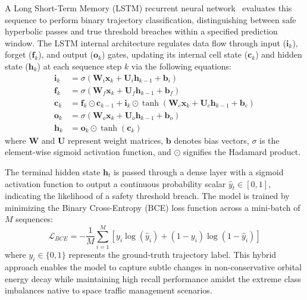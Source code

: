 \documentclass[letterpaper, preprint, 11pt]{AAS}
\begin{document}
A Long Short-Term Memory (LSTM) recurrent neural network~\cite{hochreiter_long_1997} evaluates this sequence to perform binary trajectory classification, distinguishing between safe hyperbolic passes and true threshold breaches within a specified prediction window. The LSTM internal architecture regulates data flow through input ($\mathbf{i}_k$), forget ($\mathbf{f}_k$), and output ($\mathbf{o}_k$) gates, updating its internal cell state ($\mathbf{c}_k$) and hidden state ($\mathbf{h}_k$) at each sequence step $k$ via the following equations:
\begin{align}
    \mathbf{i}_k &= \sigma\left( \mathbf{W}_i \mathbf{x}_k + \mathbf{U}_i \mathbf{h}_{k-1} + \mathbf{b}_i \right) \\
    \mathbf{f}_k &= \sigma\left( \mathbf{W}_f \mathbf{x}_k + \mathbf{U}_f \mathbf{h}_{k-1} + \mathbf{b}_f \right) \\
    \mathbf{c}_k &= \mathbf{f}_k \odot \mathbf{c}_{k-1} + \mathbf{i}_k \odot \tanh\left( \mathbf{W}_c \mathbf{x}_k + \mathbf{U}_c \mathbf{h}_{k-1} + \mathbf{b}_c \right) \\
    \mathbf{o}_k &= \sigma\left( \mathbf{W}_o \mathbf{x}_k + \mathbf{U}_o \mathbf{h}_{k-1} + \mathbf{b}_o \right) \\
    \mathbf{h}_k &= \mathbf{o}_k \odot \tanh\left( \mathbf{c}_k \right)
\end{align}
where $\mathbf{W}$ and $\mathbf{U}$ represent weight matrices, $\mathbf{b}$ denotes bias vectors, $\sigma$ is the element-wise sigmoid activation function, and $\odot$ signifies the Hadamard product.

The terminal hidden state $\mathbf{h}_t$ is passed through a dense layer with a sigmoid activation function to output a continuous probability scalar $\hat{y}_t \in [0, 1]$, indicating the likelihood of a safety threshold breach. The model is trained by minimizing the Binary Cross-Entropy (BCE) loss function across a mini-batch of $M$ sequences:
\begin{equation}
    \mathcal{L}_{BCE} = -\frac{1}{M} \sum_{i=1}^{M} \left[ y_i \log(\hat{y}_i) + (1 - y_i) \log(1 - \hat{y}_i) \right]
    \label{eq:bce_loss}
\end{equation}
where $y_i \in \{0, 1\}$ represents the ground-truth trajectory label. This hybrid approach enables the model to capture subtle changes in non-conservative orbital energy decay while maintaining high recall performance amidst the extreme class imbalances native to space traffic management scenarios.~\cite{sanchez-ortiz_automated_2022}
\end{document}
